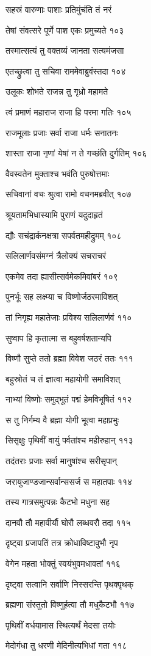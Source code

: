 सहस्रं वारुणाः पाशाः प्रतिमुंचंति तं नरं

तेषां संवत्सरे पूर्णे पाश एकः प्रमुच्यते १०३

तस्मात्सत्यं तु वक्तव्यं जानता सत्यमंजसा

एतच्छ्रुत्वा तु सचिवा राममेवाब्रुवंस्तदा १०४

उलूकः शोभते राजन्न तु गृध्रो महामते

त्वं प्रमाणं महाराज राजा हि परमा गतिः १०५

राजमूलाः प्रजाः सर्वा राजा धर्मः सनातनः

शास्ता राजा नृणां येषां न ते गच्छंति दुर्गतिम् १०६

वैवस्वतेन मुक्ताश्च भवंति पुरुषोत्तमाः

सचिवानां वचः श्रुत्वा रामो वचनमब्रवीत् १०७

श्रूयतामभिधास्यामि पुराणं यदुदाहृतं

द्यौः सचंद्रार्कनक्षत्रा सपर्वतमहीद्रुमम् १०८

सलिलार्णवसंमग्नं त्रैलोक्यं सचराचरं

एकमेव तदा ह्यासीत्सर्वमेकमिवांबरं १०९

पुनर्भूः सह लक्ष्म्या च विष्णोर्जठरमाविशत्

तां निगृह्य महातेजाः प्रविश्य सलिलार्णवं ११०

सुष्वाप हि कृतात्मा स बहुवर्षशतान्यपि

विष्णौ सुप्ते ततो ब्रह्मा विवेश जठरं ततः १११

बहुस्रोतं च तं ज्ञात्वा महायोगी समाविशत्

नाभ्यां विष्णोः समुद्भूतं पद्मं हेमविभूषितं ११२

स तु निर्गम्य वै ब्रह्मा योगी भूत्वा महाप्रभुः

सिसृक्षुः पृथिवीं वायुं पर्वतांश्च महीरुहान् ११३

तदंतराः प्रजाः सर्वा मानुषांश्च सरीसृपान्

जरायुजाण्डजान्सर्वान्ससर्ज स महातपाः ११४

तस्य गात्रसमुत्पन्नः कैटभो मधुना सह

दानवौ तौ महावीर्यौ घोरौ लब्धवरौ तदा ११५

दृष्ट्वा प्रजापतिं तत्र क्रोधाविष्टावुभौ नृप

वेगेन महता भोक्तुं स्वयंभुवमधावतां ११६

दृष्ट्वा सत्वानि सर्वाणि निस्सरन्ति पृथक्पृथक्

ब्रह्मणा संस्तुतो विष्णुर्हत्वा तौ मधुकैटभौ ११७

पृथिवीं वर्धयामास स्थित्यर्थं मेदसा तयोः

मेदोगंधा तु धरणी मेदिनीत्यभिधां गता ११८

